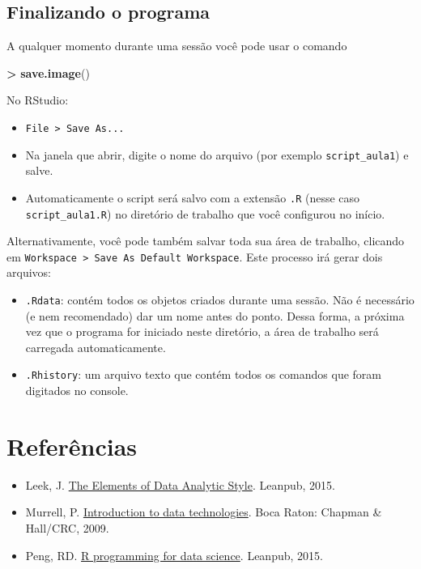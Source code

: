 \documentclass[10pt,a4paper]{book}
\newenvironment{Shaded}{\begin{snugshade}}{\end{snugshade}}
\newcommand{\KeywordTok}[1]{\textcolor[rgb]{0.13,0.29,0.53}{\textbf{#1}}}
\newcommand{\StringTok}[1]{\textcolor[rgb]{0.31,0.60,0.02}{#1}}
\newcommand{\OperatorTok}[1]{\textcolor[rgb]{0.81,0.36,0.00}{\textbf{#1}}}
\newcommand{\NormalTok}[1]{#1}
\providecommand{\tightlist}{%
  \setlength{\itemsep}{0pt}\setlength{\parskip}{0pt}}
\begin{document}
\subsection{Finalizando o programa}\label{finalizando-o-programa}

A qualquer momento durante uma sessão você pode usar o comando

\begin{Shaded}
\begin{Highlighting}[]
\OperatorTok{>}\StringTok{ }\KeywordTok{save.image}\NormalTok{()}
\end{Highlighting}
\end{Shaded}

No RStudio:

\begin{itemize}
\tightlist
\item
  \texttt{File\ \textgreater{}\ Save\ As...}
\item
  Na janela que abrir, digite o nome do arquivo (por exemplo
  \texttt{script\_aula1}) e salve.
\item
  Automaticamente o script será salvo com a extensão \texttt{.R} (nesse
  caso \texttt{script\_aula1.R}) no diretório de trabalho que você
  configurou no início.
\end{itemize}

Alternativamente, você pode também salvar toda sua área de trabalho,
clicando em
\texttt{Workspace\ \textgreater{}\ Save\ As\ Default\ Workspace}. Este
processo irá gerar dois arquivos:

\begin{itemize}
\tightlist
\item
  \texttt{.Rdata}: contém todos os objetos criados durante uma sessão.
  Não é necessário (e nem recomendado) dar um nome antes do ponto. Dessa
  forma, a próxima vez que o programa for iniciado neste diretório, a
  área de trabalho será carregada automaticamente.
\item
  \texttt{.Rhistory}: um arquivo texto que contém todos os comandos que
  foram digitados no console.
\end{itemize}

\section*{Referências}\label{referuxeancias}


\begin{itemize}
\tightlist
\item
  Leek, J. \href{https://leanpub.com/datastyle}{The Elements of Data
  Analytic Style}. Leanpub, 2015.
\item
  Murrell, P.
  \href{https://www.stat.auckland.ac.nz/~paul/ItDT/HTML}{Introduction to
  data technologies}. Boca Raton: Chapman \& Hall/CRC, 2009.
\item
  Peng, RD. \href{https://leanpub.com/rprogramming}{R programming for
  data science}. Leanpub, 2015.
\end{itemize}
\end{document}
